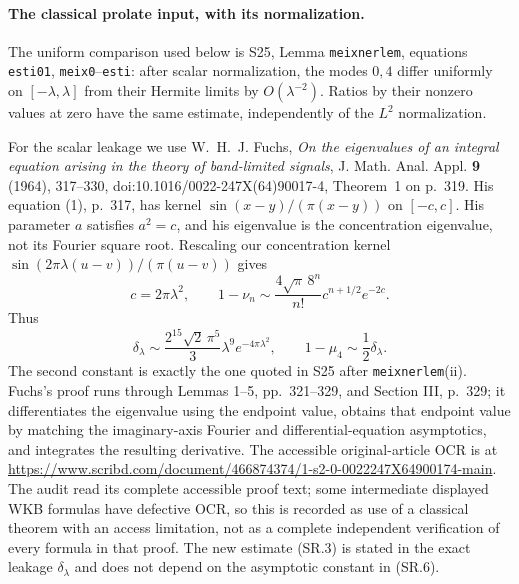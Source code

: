 \paragraph{The classical prolate input, with its normalization.}
The uniform comparison used below is S25, Lemma
\texttt{meixnerlem}, equations \texttt{esti01},
\texttt{meix0}--\texttt{esti}: after scalar normalization,
the modes $0,4$ differ uniformly on $[-\lambda,\lambda]$
from their Hermite limits by $O(\lambda^{-2})$.
Ratios by their nonzero values at zero have the same
estimate, independently of the $L^2$ normalization.

For the scalar leakage we use W.~H.~J. Fuchs,
\emph{On the eigenvalues of an integral equation arising
in the theory of band-limited signals},
J. Math. Anal. Appl. \textbf{9} (1964), 317--330,
doi:10.1016/0022-247X(64)90017-4, Theorem~1 on p.~319.
His equation (1), p.~317, has kernel
$\sin(x-y)/(\pi(x-y))$ on $[-c,c]$.  His parameter
$a$ satisfies $a^2=c$, and his eigenvalue is the
concentration eigenvalue, not its Fourier square root.
Rescaling our concentration kernel
$\sin(2\pi\lambda(u-v))/(\pi(u-v))$ gives
\[
 c=2\pi\lambda^2,\qquad
 1-\nu_n\sim\frac{4\sqrt\pi\,8^n}{n!}
                  c^{n+1/2}e^{-2c}.                \tag{SR.5}
\]
Thus
\[
 \delta_\lambda\sim
       \frac{2^{15}\sqrt2\,\pi^5}{3}
                         \lambda^9e^{-4\pi\lambda^2},
 \qquad
 1-\mu_4\sim\frac12\delta_\lambda.                \tag{SR.6}
\]
The second constant is exactly the one quoted in S25
after \texttt{meixnerlem}(ii).
Fuchs's proof runs through Lemmas 1--5, pp.~321--329,
and Section III, p.~329; it differentiates the eigenvalue
using the endpoint value, obtains that endpoint value by
matching the imaginary-axis Fourier and differential-equation
asymptotics, and integrates the resulting derivative.
The accessible original-article OCR is at
\url{https://www.scribd.com/document/466874374/1-s2-0-0022247X64900174-main}.
The audit read its complete accessible proof text; some
intermediate displayed WKB formulas have defective OCR,
so this is recorded as use of a classical theorem with
an access limitation, not as a complete independent
verification of every formula in that proof.  The
new estimate (SR.3) is stated in the exact leakage
$\delta_\lambda$ and does not depend on the asymptotic
constant in (SR.6).

